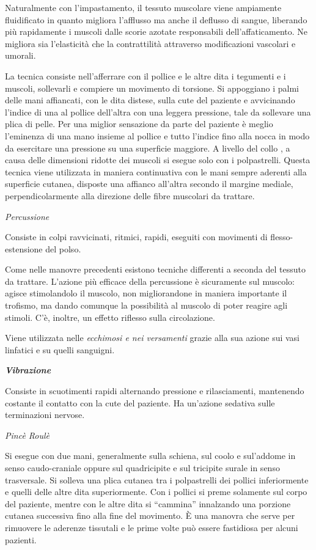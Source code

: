 \documentclass[]{article}
\begin{document}
Naturalmente con l'impastamento, il tessuto muscolare viene ampiamente
fluidificato in quanto migliora l'afflusso ma anche il deflusso di
sangue, liberando più rapidamente i muscoli dalle scorie azotate
responsabili dell'affaticamento. Ne migliora sia l'elasticità che la
contrattilità attraverso modificazioni vascolari e umorali.

La tecnica consiste nell'afferrare con il pollice e le altre dita i
tegumenti e i muscoli, sollevarli e compiere un movimento di torsione.
Si appoggiano i palmi delle mani affiancati, con le dita distese, sulla
cute del paziente e avvicinando l'indice di una al pollice dell'altra
con una leggera pressione, tale da sollevare una plica di pelle. Per una
miglior sensazione da parte del paziente è meglio l'eminenza di una mano
insieme al pollice e tutto l'indice fino alla nocca in modo da
esercitare una pressione su una superficie maggiore. A livello del collo
, a causa delle dimensioni ridotte dei muscoli si esegue solo con i
polpastrelli. Questa tecnica viene utilizzata in maniera continuativa
con le mani sempre aderenti alla superficie cutanea, disposte una
affianco all'altra secondo il margine mediale, perpendicolarmente alla
direzione delle fibre muscolari da trattare.

\emph{\emph{Percussione}}

Consiste in colpi ravvicinati, ritmici, rapidi, eseguiti con movimenti
di flesso-estensione del polso.

Come nelle manovre precedenti esistono tecniche differenti a seconda del
tessuto da trattare. L'azione più efficace della percussione è
sicuramente sul muscolo: agisce stimolandolo il muscolo, non
migliorandone in maniera importante il trofismo, ma dando comunque la
possibilità al muscolo di poter reagire agli stimoli. C'è, inoltre, un
effetto riflesso sulla circolazione.

Viene utilizzata nelle \emph{ecchimosi e nei versamenti} grazie alla sua
azione sui vasi linfatici e su quelli sanguigni.

\textbf{\emph{Vibrazione}}

Consiste in scuotimenti rapidi alternando pressione e rilasciamenti,
mantenendo costante il contatto con la cute del paziente. Ha un'azione
sedativa sulle terminazioni nervose.

\emph{Pincè Roulè}

Si esegue con due mani, generalmente sulla schiena, sul coolo e
sul'addome in senso caudo-craniale oppure sul quadricipite e sul
tricipite surale in senso trasversale. Si solleva una plica cutanea tra
i polpastrelli dei pollici inferiormente e quelli delle altre dita
superiormente. Con i pollici si preme solamente sul corpo del paziente,
mentre con le altre dita si ``cammina'' innalzando una porzione cutanea
successiva fino alla fine del movimento. È una manovra che serve per
rimuovere le aderenze tissutali e le prime volte può essere fastidiosa
per alcuni pazienti.
\end{document}
